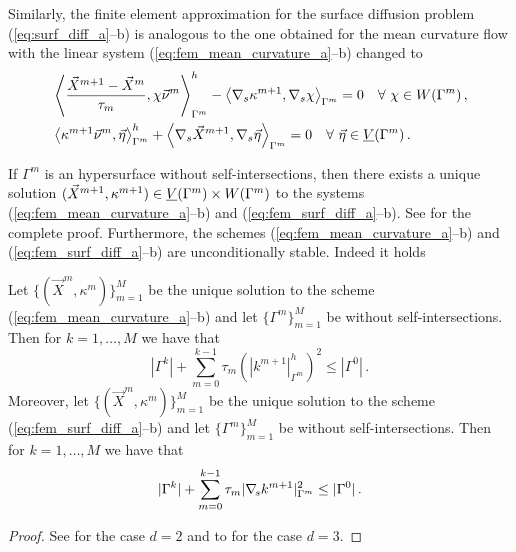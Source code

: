 Similarly, the finite element approximation for the surface diffusion problem
(\ref{eq:surf_diff_a}--b) is analogous to the one obtained for the mean
curvature flow with the linear system (\ref{eq:fem_mean_curvature_a}--b)
changed to
\begin{subequations}
\begin{align}
&\left\langle \frac{\vec X^{m + 1} - \vec X^m}{\tau_m},
\chi\vec \nu^m\right\rangle_{\Gamma^m}^h - \left\langle\nabla_s\kappa^{m+1},
\nabla_s\chi\right\rangle_{\Gamma^m}=0\quad \forall\ \chi \in
W(\Gamma^m)\,,\label{eq:fem_surf_diff_a}\\
&\left\langle\kappa^{m+1}\vec \nu^m, \vec \eta\right\rangle_{\Gamma^m}^h +
\left\langle\nabla_s\vec X^{m + 1},
\nabla_s\vec \eta\right\rangle_{\Gamma^m}=0\quad \forall\ \vec\eta \in \underline{V}(\Gamma^m)\,.
\label{eq:fem_surf_diff_b}
\end{align}
\end{subequations}

If $\Gamma^m$ is an hypersurface without self-intersections, then there exists
a unique solution $(\vec X^{m+1}, \kappa^{m+1}) \in \underline{V}(\Gamma^m) \times W(\Gamma^m)$ to the
systems (\ref{eq:fem_mean_curvature_a}--b) and (\ref{eq:fem_surf_diff_a}--b).
See \cite[Theorem~2.1]{gflows3d} for the complete proof. Furthermore,
the schemes (\ref{eq:fem_mean_curvature_a}--b) and
(\ref{eq:fem_surf_diff_a}--b) are unconditionally stable. Indeed it holds
\begin{theorem}
Let $\{(\vec X^m, \kappa^m)\}_{m=1}^M$ be the unique solution to the scheme
(\ref{eq:fem_mean_curvature_a}--b) and let $\{\Gamma^m\}_{m=1}^M$
be without self-intersections. Then for ${k=1,\ldots,M}$ we have that
\begin{equation*}
|\Gamma^k|+\sum_{m=0}^{k-1} \tau_m(|k^{m+1}|_{\Gamma^m}^h)^2\leq|\Gamma^0|\,.
\end{equation*}
Moreover, let $\{(\vec X^m, \kappa^m)\}_{m=1}^M$ be the unique solution to the
scheme (\ref{eq:fem_surf_diff_a}--b) and let $\{\Gamma^m\}_{m=1}^M$ be without
self-intersections. Then for $k=1,\ldots,M$ we have that
\begin{equation*}
|\Gamma^k|+\sum_{m=0}^{k-1}\tau_m|\nabla_{\!s} k^{m+1}|_{\Gamma^m}^2\leq|\Gamma^0|\,.
\end{equation*}
\end{theorem}

\begin{proof}
See \cite[Theorem~2.3]{triplej} for the case $d = 2$ and to
\cite[Theorem~2.2]{gflows3d} for the case $d = 3$.
\end{proof}

